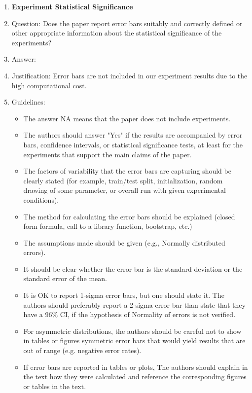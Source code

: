 \documentclass{article}
\begin{document}
\begin{enumerate}
\item {\bf Experiment Statistical Significance}
    \item[] Question: Does the paper report error bars suitably and correctly defined or other appropriate information about the statistical significance of the experiments?
    \item[] Answer: \answerNo{} %
    \item[] Justification: Error bars are not included in our experiment results due to the high computational cost.
    \item[] Guidelines:
    \begin{itemize}
        \item The answer NA means that the paper does not include experiments.
        \item The authors should answer "Yes" if the results are accompanied by error bars, confidence intervals, or statistical significance tests, at least for the experiments that support the main claims of the paper.
        \item The factors of variability that the error bars are capturing should be clearly stated (for example, train/test split, initialization, random drawing of some parameter, or overall run with given experimental conditions).
        \item The method for calculating the error bars should be explained (closed form formula, call to a library function, bootstrap, etc.)
        \item The assumptions made should be given (e.g., Normally distributed errors).
        \item It should be clear whether the error bar is the standard deviation or the standard error of the mean.
        \item It is OK to report 1-sigma error bars, but one should state it. The authors should preferably report a 2-sigma error bar than state that they have a 96\% CI, if the hypothesis of Normality of errors is not verified.
        \item For asymmetric distributions, the authors should be careful not to show in tables or figures symmetric error bars that would yield results that are out of range (e.g. negative error rates).
        \item If error bars are reported in tables or plots, The authors should explain in the text how they were calculated and reference the corresponding figures or tables in the text.
    \end{itemize}


\end{enumerate}
\end{document}

